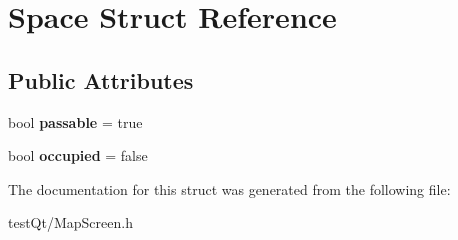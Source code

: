 \hypertarget{struct_space}{}\section{Space Struct Reference}
\label{struct_space}
\subsection*{Public Attributes}
\begin{DoxyCompactItemize}
\item 
\hypertarget{struct_space_a9b97b8498860f8eaf1e069ee8359c82e}{}\label{struct_space_a9b97b8498860f8eaf1e069ee8359c82e} 
bool {\bfseries passable} = true
\item 
\hypertarget{struct_space_a4a32796e863087ca621c8d82f5a1a58e}{}\label{struct_space_a4a32796e863087ca621c8d82f5a1a58e} 
bool {\bfseries occupied} = false
\end{DoxyCompactItemize}


The documentation for this struct was generated from the following file\+:\begin{DoxyCompactItemize}
\item 
test\+Qt/Map\+Screen.\+h\end{DoxyCompactItemize}
